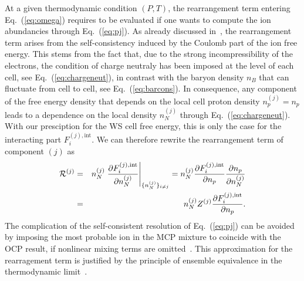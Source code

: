 At a given thermodynamic condition $(P,T)$, the rearrangement term entering 
Eq.~(\ref{eq:omega}) requires to be evaluated if one wants to compute the ion 
abundancies through Eq.~(\ref{eq:pj}).
As already discussed in~\cite{Fantina2020}, the rearrangement term arises from 
the self-consistency induced by the Coulomb part of the ion free energy. This 
stems from the fact that, due to the strong incompressibility of the electrons, 
the condition of charge neutraly has been imposed at the level of each cell, 
see Eq.~(\ref{eq:chargeneut}), in contrast with the baryon density $n_B$ that 
can fluctuate from cell to cell, see Eq.~(\ref{eq:barcons}). 
In consequence, any component of the free energy density that depends on the 
local cell proton density $n_p^{(j)} = n_p$ leads to a dependence on the local 
density $n_N^{(j)}$ through Eq.~(\ref{eq:chargeneut}). With our presciption for 
the WS cell free energy, this is only the case for the interacting part 
$F_i^{(j),\text{int}}$. We can therefore rewrite the rearrangement term of 
component $(j)$ as
%
\begin{eqnarray}
  \mathcal{R}^{(j)} 
  &=& n_N^{(j)} \left.\frac{\partial F_i^{(j),\text{int}}}{\partial
    n_N^{(j)}}\right|_{\{n_N^{(j)}\}_{i\neq j}}
    = n_N^{(j)} \frac{\partial F_i^{(j),\text{int}}}{\partial n_p}
    \frac{\partial n_p}{\partial n_N^{(j)}}\notag\\
  &=& n_N^{(j)} Z^{(j)} \frac{\partial F_i^{(j),\text{int}}}{\partial n_p}.
\end{eqnarray}
%
The complication of the self-consistent resolution of Eq.~(\ref{eq:pj}) can be 
avoided by imposing the most probable ion in the MCP mixture to coincide with 
the OCP result, if nonlinear mixing terms are omitted~\cite{Grams2018}. 
This approximation for the rearragement term is justified by the principle of 
ensemble equivalence in the thermodynamic limit~\cite{Gulminelli2015}.

